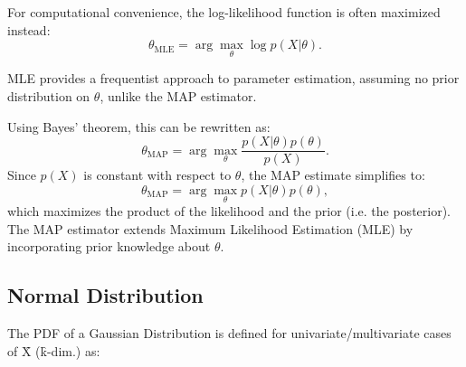 For computational convenience, the log-likelihood function is often maximized instead:  
\[
\theta_{\text{MLE}} = \arg\max_{\theta} \log p(X|\theta).
\]

MLE provides a frequentist approach to parameter estimation, assuming no prior distribution on \( \theta \), unlike the MAP estimator.



Using Bayes' theorem, this can be rewritten as:  
\[
\theta_{\text{MAP}} = \arg\max_{\theta} \frac{p(X|\theta) p(\theta)}{p(X)}.
\]
Since \( p(X) \) is constant with respect to \( \theta \), the MAP estimate simplifies to:  
\[
\theta_{\text{MAP}} = \arg\max_{\theta} p(X|\theta) p(\theta),
\]
which maximizes the product of the likelihood and the prior (i.e. the posterior). The MAP estimator extends Maximum Likelihood Estimation (MLE) by incorporating prior knowledge about \( \theta \).

\subsection{Normal Distribution}
The PDF of a Gaussian Distribution is defined for univariate/multivariate cases of \f{X} (\f{k}-dim.) as:
